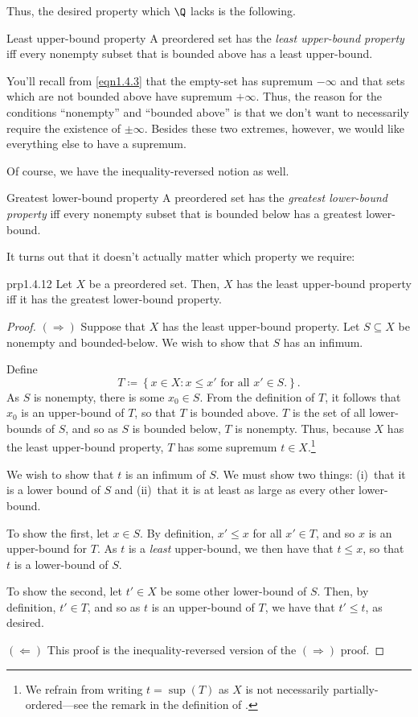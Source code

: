 Thus, the desired property which $\Q$ lacks is the following.
\begin{dfn}{Least upper-bound property}{}
A preordered set has the \emph{least upper-bound property} iff every nonempty subset that is bounded above has a least upper-bound.
\begin{rmk}
You'll recall from \eqref{eqn1.4.3} that the empty-set has supremum $-\infty$ and that sets which are not bounded above have supremum $+\infty$.  Thus, the reason for the conditions ``nonempty'' and ``bounded above'' is that we don't want to necessarily require the existence of $\pm \infty$.  Besides these two extremes, however, we would like everything else to have a supremum.
\end{rmk}
\end{dfn}
Of course, we have the inequality-reversed notion as well.
\begin{dfn}{Greatest lower-bound property}{}
A preordered set has the \emph{greatest lower-bound property} iff every nonempty subset that is bounded below has a greatest lower-bound.
\end{dfn}
It turns out that it doesn't actually matter which property we require:
\begin{prp}{}{prp1.4.12}
Let $X$ be a preordered set.  Then, $X$ has the least upper-bound property iff it has the greatest lower-bound property.
\begin{proof}
$(\Rightarrow )$ Suppose that $X$ has the least upper-bound property.  Let $S\subseteq X$ be nonempty and bounded-below.  We wish to show that $S$ has an infimum.

Define
\begin{equation}
T\coloneqq \left\{ x\in X:x\leq x'\text{ for all }x'\in S\text{.}\right\} .
\end{equation}
As $S$ is nonempty, there is some $x_0\in S$.  From the definition of $T$, it follows that $x_0$ is an upper-bound of $T$, so that $T$ is bounded above.  $T$ is the set of all lower-bounds of $S$, and so as $S$ is bounded below, $T$ is nonempty.  Thus, because $X$ has the least upper-bound property, $T$ has some supremum $t\in X$.\footnote{We refrain from writing $t=\sup (T)$ as $X$ is not necessarily partially-ordered---see the remark in the definition of .}

We wish to show that $t$ is an infimum of $S$.  We must show two things:  (i)~that it is a lower bound of $S$ and (ii)~that it is at least as large as every other lower-bound.

To show the first, let $x\in S$.  By definition, $x'\leq x$ for all $x'\in T$, and so $x$ is an upper-bound for $T$.  As $t$ is a \emph{least} upper-bound, we then have that $t\leq x$, so that $t$ is a lower-bound of $S$.

To show the second, let $t'\in X$ be some other lower-bound of $S$.  Then, by definition, $t'\in T$, and so as $t$ is an upper-bound of $T$, we have that $t'\leq t$, as desired.

\blankline
\noindent
$(\Leftarrow )$ This proof is the inequality-reversed version of the $(\Rightarrow )$ proof.
\end{proof}
\end{prp}
